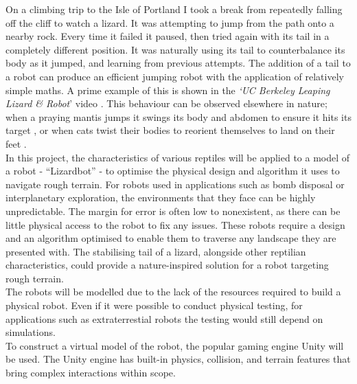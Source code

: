 \documentclass{article}
\begin{document}
On a climbing trip to the Isle of Portland I took a break from repeatedly falling off the cliff to watch a lizard. It was attempting to jump from the path onto a nearby rock. Every time it failed it paused, then tried again with its tail in a completely different position. It was naturally using its tail to counterbalance its body as it jumped, and learning from previous attempts. The addition of a tail to a robot can produce an efficient jumping robot with the application of relatively simple maths. A prime example of this is shown in the \textit{‘UC Berkeley Leaping Lizard \& Robot}’ video . This behaviour can be observed elsewhere in nature; when a praying mantis jumps it swings its body and abdomen to ensure it hits its target ,  or when cats twist their bodies to reorient themselves to land on their feet .\\

In this project, the characteristics of various reptiles will be applied to a model of a robot - “Lizardbot” - to optimise the physical design and algorithm it uses to navigate rough terrain. For robots used in applications such as bomb disposal or interplanetary exploration, the environments that they face can be highly unpredictable. The margin for error is often low to nonexistent, as there can be little physical access to the robot to fix any issues. These robots require a design and an algorithm optimised to enable them to traverse any landscape they are presented with. The stabilising tail of a lizard, alongside other reptilian characteristics, could provide a nature-inspired solution for a robot targeting rough terrain.\\

The robots will be modelled due to the lack of the resources required to build a physical robot. Even if it were possible to conduct physical testing, for applications such as extraterrestial robots the testing would still depend on simulations.\\
To construct a virtual model of the robot, the popular gaming engine Unity  will be used. The Unity engine has built-in physics, collision, and terrain features that bring complex interactions within scope.


\newpage
\end{document}
